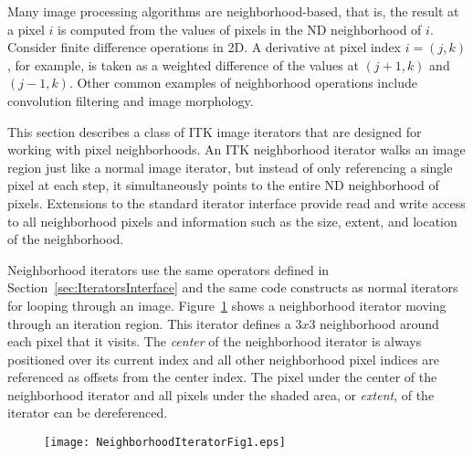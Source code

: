 Many image processing algorithms are neighborhood-based, that is, the result at
a pixel $i$ is computed from the values of pixels in the ND neighborhood of
$i$. Consider finite difference operations in 2D.  A derivative at pixel index
$i = (j, k)$, for example, is taken as a weighted difference of the values
at $(j+1, k)$ and $(j-1, k)$. Other common examples of neighborhood operations
include convolution filtering and image morphology.

This section describes a class of ITK image iterators that are designed for
working with pixel neighborhoods. An ITK neighborhood iterator walks an image
region just like a normal image iterator, but instead of only referencing a
single pixel at each step, it simultaneously points to the entire ND
neighborhood of pixels.  Extensions to the standard iterator interface provide
read and write access to all neighborhood pixels and information
such as the size, extent, and location of the neighborhood.

Neighborhood iterators use the same operators defined in
Section~\ref{sec:IteratorsInterface} and the same code constructs as normal
iterators for looping through an
image. Figure~\ref{fig:NeighborhoodIteratorFig1} shows a neighborhood iterator
moving through an iteration region.  This iterator defines a $3x3$ neighborhood
around each pixel that it visits. The \emph{center} of the neighborhood
iterator is always positioned over its current index and all other neighborhood
pixel indices are referenced as offsets from the center index.  The pixel
under the center of the neighborhood iterator and all pixels under the shaded
area, or \emph{extent}, of the iterator can be dereferenced.



\begin{figure}
\centering
\texttt{[image: NeighborhoodIteratorFig1.eps]}
\protect\label{fig:NeighborhoodIteratorFig1}
\end{figure}



